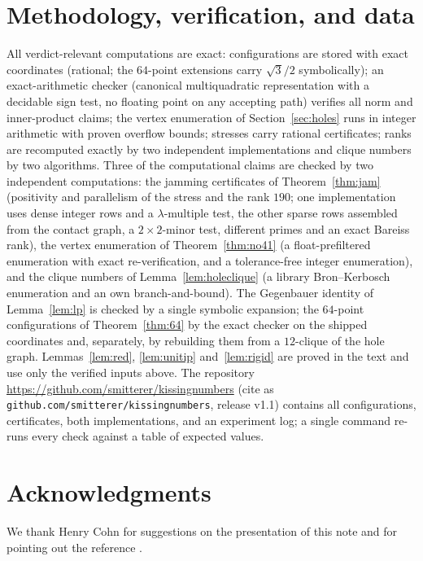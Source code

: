 \documentclass[11pt]{article}
\theoremstyle{remark}
\begin{document}
\section{Methodology, verification, and data}\label{sec:methods}

All verdict-relevant computations are exact: configurations are stored
with exact coordinates (rational; the $64$-point extensions carry
$\sqrt3/2$ symbolically); an exact-arithmetic checker (canonical
multiquadratic representation with a decidable sign test, no floating
point on any accepting path) verifies all norm and inner-product
claims; the vertex enumeration of Section~\ref{sec:holes} runs in
integer arithmetic with proven overflow bounds; stresses carry rational
certificates; ranks are recomputed exactly by two independent
implementations and clique numbers by two algorithms. Three of the
computational claims are checked by two independent computations: the
jamming certificates of Theorem~\ref{thm:jam} (positivity and parallelism
of the stress and the rank $190$; one implementation uses dense integer
rows and a $\lambda$-multiple test, the other sparse rows assembled from
the contact graph, a $2\times 2$-minor test, different primes and an
exact Bareiss rank), the vertex enumeration of Theorem~\ref{thm:no41}
(a float-prefiltered enumeration with exact re-verification, and a
tolerance-free integer enumeration), and the clique numbers of
Lemma~\ref{lem:holeclique} (a library Bron--Kerbosch enumeration and an
own branch-and-bound). The Gegenbauer identity of Lemma~\ref{lem:lp} is
checked by a single symbolic expansion; the $64$-point configurations of
Theorem~\ref{thm:64} by the exact checker on the shipped coordinates and,
separately, by rebuilding them from a $12$-clique of the hole graph.
Lemmas~\ref{lem:red}, \ref{lem:unitip} and~\ref{lem:rigid} are proved in
the text and use only the verified inputs above. The repository
\url{https://github.com/smitterer/kissingnumbers} (cite as
\texttt{github.com/smitterer/kissingnumbers}, release v1.1) contains all
configurations, certificates, both implementations, and an experiment log; a
single command re-runs every check against a table of expected values.

\section*{Acknowledgments}
We thank Henry Cohn for suggestions on the presentation of this note and
for pointing out the reference \cite{Lev1979}.
\end{document}
